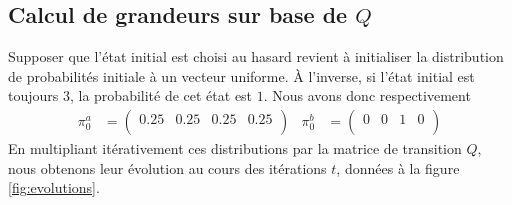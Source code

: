 \documentclass[a4paper, 12pt]{report}
\begin{document}
	\subsection{Calcul de grandeurs sur base de $Q$}
	Supposer que l'état initial est choisi au hasard revient à initialiser la distribution de probabilités initiale à un vecteur uniforme. À l'inverse, si l'état initial est toujours $3$, la probabilité de cet état est $1$. Nous avons donc respectivement
	\begin{align*}
	    \pi_0^a & =
	    \begin{pmatrix}
	        \num{0.25} & \num{0.25} & \num{0.25} & \num{0.25} \\
	    \end{pmatrix}
	    &
	    \pi_0^b & =
	    \begin{pmatrix}
	        \num{0} & \num{0} & \num{1} & \num{0} \\
	    \end{pmatrix}
    \end{align*}
    En multipliant itérativement ces distributions par la matrice de transition $Q$, nous obtenons leur évolution au cours des itérations $t$, données à la figure \ref{fig:evolutions}.
\end{document}
